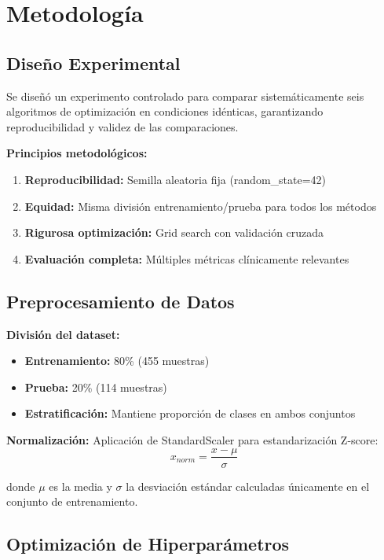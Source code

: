 \documentclass[12pt,a4paper]{article}
\begin{document}
\section{Metodología}

\subsection{Diseño Experimental}

Se diseñó un experimento controlado para comparar sistemáticamente seis algoritmos de optimización en condiciones idénticas, garantizando reproducibilidad y validez de las comparaciones.

\textbf{Principios metodológicos:}
\begin{enumerate}
    \item \textbf{Reproducibilidad:} Semilla aleatoria fija (random\_state=42)
    \item \textbf{Equidad:} Misma división entrenamiento/prueba para todos los métodos
    \item \textbf{Rigurosa optimización:} Grid search con validación cruzada
    \item \textbf{Evaluación completa:} Múltiples métricas clínicamente relevantes
\end{enumerate}

\subsection{Preprocesamiento de Datos}

\textbf{División del dataset:}
\begin{itemize}
    \item \textbf{Entrenamiento:} 80\% (455 muestras)
    \item \textbf{Prueba:} 20\% (114 muestras)
    \item \textbf{Estratificación:} Mantiene proporción de clases en ambos conjuntos
\end{itemize}

\textbf{Normalización:}
Aplicación de StandardScaler para estandarización Z-score:
\begin{equation}
x_{norm} = \frac{x - \mu}{\sigma}
\end{equation}

donde $\mu$ es la media y $\sigma$ la desviación estándar calculadas únicamente en el conjunto de entrenamiento.

\subsection{Optimización de Hiperparámetros}
\end{document}
